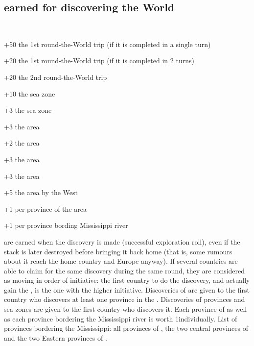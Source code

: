 \subsection{\VPs earned for discovering the World}
\aparag[Discoveries]~\\
\begin{modlist}
\item[+50] the 1st round-the-World trip (if it is completed in a single turn)
\item[+20] the 1st round-the-World trip (if it is completed in 2 turns)
\item[+20] the 2nd round-the-World trip
\item[+10] the \seazoneHorn sea zone
\item[+3] the \seazoneHudson sea zone
\item[+3] the \granderegionQuebec area
\item[+2] the  area
\item[+3] the \granderegionRocheuses area
\item[+3] the \granderegionAlaska area
\item[+5] the \granderegionPanama area by the West
\item[+1] per province of the \granderegionAmazonia area
\item[+1] per province bording Mississippi river
\end{modlist}

\aparag[Discoveries] \VPs are earned when the discovery is made
(successful exploration roll), even if the stack is later destroyed
before bringing it back home (that is, some rumours about it reach the
home country and Europe anyway).
\bparag If several countries are able to claim \VPs for the same
discovery during the same round, they are considered as moving in order
of initiative: the first country to do the discovery, and actually gain
the \VPs, is the one with the higher initiative.
\bparag Discoveries \VPs of \Areas are given to the first country who
discovers at least one province in the \Area.
\bparag Discoveries \VPs of provinces and sea zones are given to the first
country who discovers it. Each province of \granderegionAmazonia as well as
each province bordering the Mississippi river is worth 1\VP individually.
\bparag List of provinces bordering the Mississippi: all provinces of
\granderegionMississippi, the two central provinces of \granderegionIllinois
and the two Eastern provinces of \granderegionKansas.


